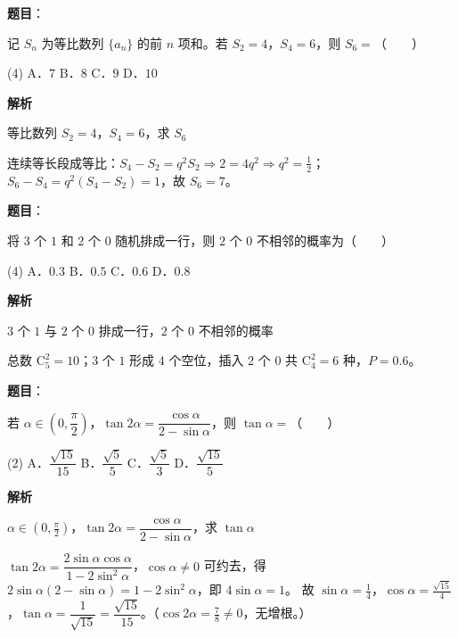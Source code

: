 \begin{answer}

\textbf{题目}：

记 $S_n$ 为等比数列 $\{a_n\}$ 的前 $n$ 项和。若 $S_2=4$，$S_4=6$，则 $S_6=$\mbox{（　　）}

\begin{gkopts}(4)
\task A．$7$
\task B．$8$
\task C．$9$
\task D．$10$
\end{gkopts}

\textbf{解析}

等比数列 $S_2=4$，$S_4=6$，求 $S_6$

连续等长段成等比：$S_4-S_2=q^2S_2\Rightarrow2=4q^2\Rightarrow q^2=\tfrac12$；$S_6-S_4=q^2(S_4-S_2)=1$，故 $S_6=7$。


\end{answer}
\begin{answer}

\textbf{题目}：

将 $3$ 个 $1$ 和 $2$ 个 $0$ 随机排成一行，则 $2$ 个 $0$ 不相邻的概率为\mbox{（　　）}

\begin{gkopts}(4)
\task A．$0.3$
\task B．$0.5$
\task C．$0.6$
\task D．$0.8$
\end{gkopts}

\textbf{解析}

$3$ 个 $1$ 与 $2$ 个 $0$ 排成一行，$2$ 个 $0$ 不相邻的概率

总数 $\mathrm C_5^2=10$；$3$ 个 $1$ 形成 $4$ 个空位，插入 $2$ 个 $0$ 共 $\mathrm C_4^2=6$ 种，$P=0.6$。


\end{answer}
\begin{answer}

\textbf{题目}：

若 $\alpha\in\left(0,\dfrac\pi2\right)$，$\tan2\alpha=\dfrac{\cos\alpha}{2-\sin\alpha}$，则 $\tan\alpha=$\mbox{（　　）}

\begin{gkopts}(2)
\task A．$\dfrac{\sqrt{15}}{15}$
\task B．$\dfrac{\sqrt5}5$
\task C．$\dfrac{\sqrt5}3$
\task D．$\dfrac{\sqrt{15}}5$
\end{gkopts}

\textbf{解析}

$\alpha\in\left(0,\tfrac\pi2\right)$，$\tan2\alpha=\dfrac{\cos\alpha}{2-\sin\alpha}$，求 $\tan\alpha$

$\tan2\alpha=\dfrac{2\sin\alpha\cos\alpha}{1-2\sin^2\alpha}$，$\cos\alpha\ne0$ 可约去，得 $2\sin\alpha(2-\sin\alpha)=1-2\sin^2\alpha$，即 $4\sin\alpha=1$。
故 $\sin\alpha=\tfrac14$，$\cos\alpha=\tfrac{\sqrt{15}}4$，$\tan\alpha=\dfrac1{\sqrt{15}}=\dfrac{\sqrt{15}}{15}$。（$\cos2\alpha=\tfrac78\ne0$，无增根。）


\end{answer}
